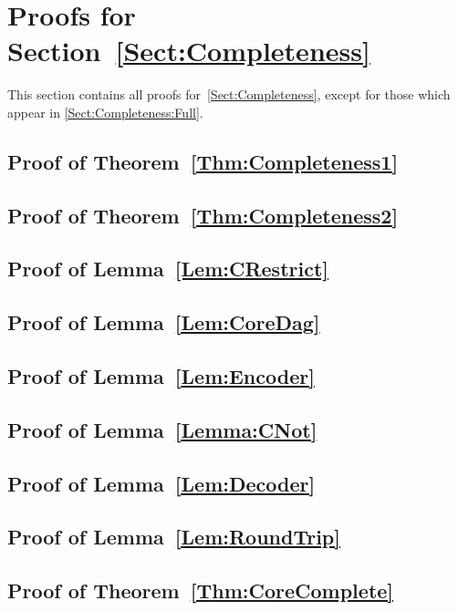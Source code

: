 \section{Proofs for Section~\ref{Sect:Completeness}}
%

This section contains all proofs for~\cref{Sect:Completeness}, except for those which appear in \cref{Sect:Completeness:Full}.

\subsection{Proof of Theorem~\ref{Thm:Completeness1}}
%


\subsection{Proof of Theorem~\ref{Thm:Completeness2}}
%


\subsection{Proof of Lemma~\ref{Lem:CRestrict}}
%


\subsection{Proof of Lemma~\ref{Lem:CoreDag}}
%


\subsection{Proof of Lemma~\ref{Lem:Encoder}}
%


\subsection{Proof of Lemma~\ref{Lemma:CNot}}
%
\label{App:CNOT}


\subsection{Proof of Lemma~\ref{Lem:Decoder}}
%


\subsection{Proof of Lemma~\ref{Lem:RoundTrip}}
%


\subsection{Proof of Theorem~\ref{Thm:CoreComplete}}
%
